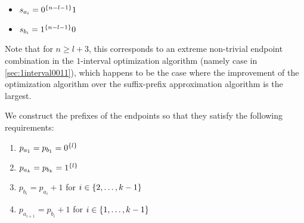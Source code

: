 \begin{itemize}
\item $s_{a_i} = 0^{\{n-l-1\}} 1$
\item $s_{b_i} = 1^{\{n-l-1\}} 0$
\end{itemize}

Note that for $n \geq l + 3$,
this  corresponds to an extreme
non-trivial endpoint combination in the $1$-interval
optimization algorithm
(namely case 
in \cref{sec:1interval0011}),
which happens to be the case where the improvement
of the optimization algorithm
over the suffix-prefix approximation algorithm
is the largest.

We construct the  prefixes of the endpoints
so that they
satisfy the following requirements:

\begin{enumerate}
\item \label{item:hardint1}
$p_{a_1} = p_{b_1} = 0^{\{l\}}$
\item \label{item:hardintk}
$p_{a_k} = p_{b_k} = 1^{\{l\}}$
\item \label{item:hardlength}
$p_{b_i} = p_{a_i} + 1$
for $i \in \{2, \ldots, k-1\}$
\item \label{item:hardspacing}
$p_{a_{i+1}} = p_{b_i} + 1$
for $i \in \{1, \ldots, k-1\}$
\end{enumerate}

%
%
%
%
%


